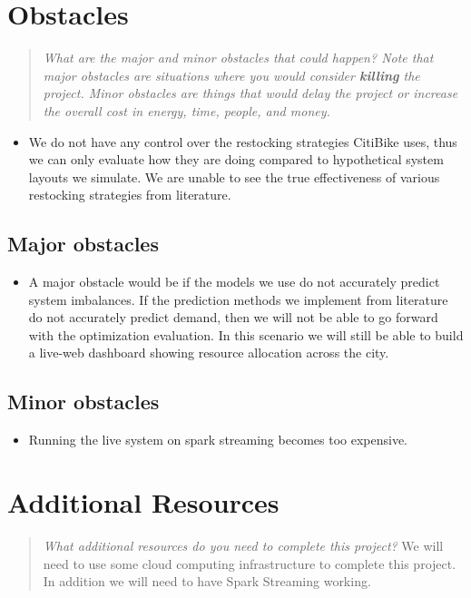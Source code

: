 \documentclass{proc}
\begin{document}
\section{Obstacles}
\begin{quote}
\emph{What are the major and minor obstacles that could happen? 
Note that major obstacles are situations where you would consider \textbf{killing} the project. 
Minor obstacles are things that would delay the project or increase the overall cost in energy, time, people, and money.}
\end{quote}

\begin{itemize}
 \item We do not have any control over the restocking strategies CitiBike uses, thus we can only evaluate how they are doing compared to hypothetical system layouts we simulate. We are unable to see the true effectiveness of various restocking strategies from literature.

\end{itemize}


\subsection{Major obstacles} 

\begin{itemize}
  \item A major obstacle would be if the models we use do not accurately predict system imbalances. If the prediction methods we implement from literature do not accurately predict demand, then we will not be able to go forward with the optimization evaluation. In this scenario we will still be able to build a live-web dashboard showing resource allocation across the city.
\end{itemize}

\subsection{Minor obstacles}

\begin{itemize}
  \item Running the live system on spark streaming becomes too expensive.
\end{itemize}


\section{Additional Resources}
\begin{quote}
\emph{What additional resources do you need to complete this project?}
We will need to use some cloud computing infrastructure to complete this project. In addition we will need to have Spark Streaming working.
\end{quote}
\end{document}
